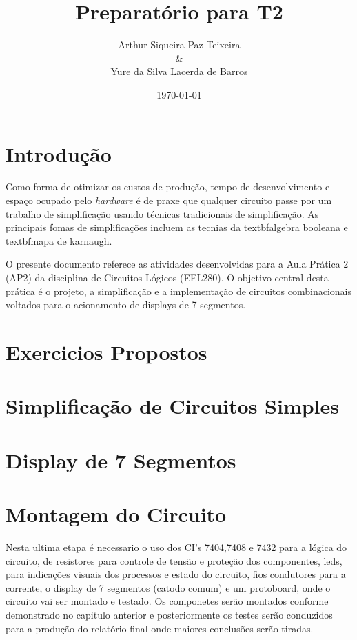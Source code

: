 \documentclass[11pt]{report}         %
\title{\textbf{Preparatório para T2}}
\author{Arthur Siqueira Paz Teixeira \\ \& \\ Yure da Silva Lacerda de Barros}
\affil{Disciplina: Circuitos Lógicos -- Professor: Fabio Marujo}
\date{\today}
\begin{document}

\maketitle                        %
\tableofcontents                  %

\chapter {Introdução}             %

Como forma de otimizar os custos de produção, tempo de desenvolvimento e espaço ocupado pelo \textit{hardware} é de praxe que qualquer circuito
passe por um trabalho de simplificação usando técnicas tradicionais de simplificação. As principais fomas de simplificações incluem as tecnias da 
textbf{algebra booleana} e textbf{mapa de karnaugh}.

O presente documento referece as atividades desenvolvidas para a Aula Prática 2 (AP2) da disciplina de Circuitos Lógicos (EEL280). O objetivo 
central desta prática é o projeto, a simplificação e a implementação de circuitos combinacionais voltados para o acionamento de displays de 7 segmentos.

\chapter {Exercicios Propostos}



\chapter {Simplificação de Circuitos Simples}



\chapter {Display de 7 Segmentos}



\chapter {Montagem do Circuito}

Nesta ultima etapa é necessario o uso dos CI's 7404,7408 e 7432 para a lógica do circuito, de resistores para controle de tensão e proteção dos componentes, 
leds, para indicações visuais dos processos e estado do circuito, fios condutores para a corrente, o display de 7 segmentos (catodo comum) e um protoboard, 
onde o circuito vai ser montado e testado. Os componetes serão montados conforme demonstrado no capitulo anterior e posteriormente os testes serão conduzidos 
para a produção do relatório final onde maiores conclusões serão tiradas.
\end{document}
